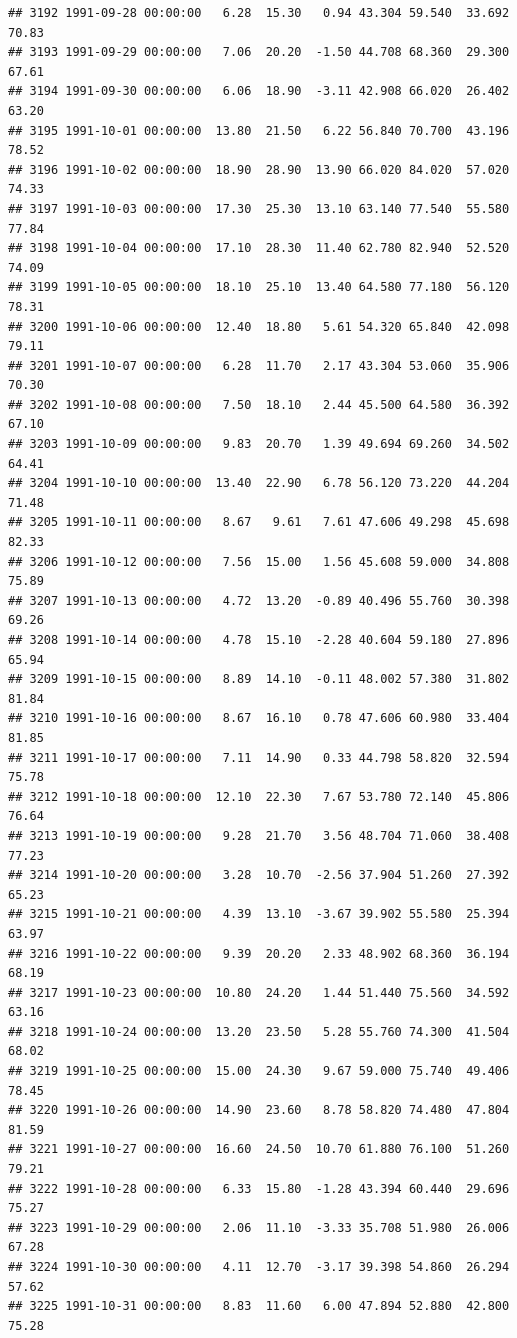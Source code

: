 \documentclass{article}\usepackage{graphicx, color}
\makeatletter
\newenvironment{kframe}{%
 \def\at@end@of@kframe{}%
 \ifinner\ifhmode%
  \def\at@end@of@kframe{\end{minipage}}%
  \begin{minipage}{\columnwidth}%
 \fi\fi%
 \def\FrameCommand##1{\hskip\@totalleftmargin \hskip-\fboxsep
 \colorbox{shadecolor}{##1}\hskip-\fboxsep
     \hskip-\linewidth \hskip-\@totalleftmargin \hskip\columnwidth}%
 \MakeFramed {\advance\hsize-\width
   \@totalleftmargin\z@ \linewidth\hsize
   \@setminipage}}%
 {\par\unskip\endMakeFramed%
 \at@end@of@kframe}
\newenvironment{knitrout}{}{} %
\makeatother
\begin{document}
\begin{knitrout}
\begin{kframe}
\begin{verbatim}
## 3192 1991-09-28 00:00:00   6.28  15.30   0.94 43.304 59.540  33.692  70.83
## 3193 1991-09-29 00:00:00   7.06  20.20  -1.50 44.708 68.360  29.300  67.61
## 3194 1991-09-30 00:00:00   6.06  18.90  -3.11 42.908 66.020  26.402  63.20
## 3195 1991-10-01 00:00:00  13.80  21.50   6.22 56.840 70.700  43.196  78.52
## 3196 1991-10-02 00:00:00  18.90  28.90  13.90 66.020 84.020  57.020  74.33
## 3197 1991-10-03 00:00:00  17.30  25.30  13.10 63.140 77.540  55.580  77.84
## 3198 1991-10-04 00:00:00  17.10  28.30  11.40 62.780 82.940  52.520  74.09
## 3199 1991-10-05 00:00:00  18.10  25.10  13.40 64.580 77.180  56.120  78.31
## 3200 1991-10-06 00:00:00  12.40  18.80   5.61 54.320 65.840  42.098  79.11
## 3201 1991-10-07 00:00:00   6.28  11.70   2.17 43.304 53.060  35.906  70.30
## 3202 1991-10-08 00:00:00   7.50  18.10   2.44 45.500 64.580  36.392  67.10
## 3203 1991-10-09 00:00:00   9.83  20.70   1.39 49.694 69.260  34.502  64.41
## 3204 1991-10-10 00:00:00  13.40  22.90   6.78 56.120 73.220  44.204  71.48
## 3205 1991-10-11 00:00:00   8.67   9.61   7.61 47.606 49.298  45.698  82.33
## 3206 1991-10-12 00:00:00   7.56  15.00   1.56 45.608 59.000  34.808  75.89
## 3207 1991-10-13 00:00:00   4.72  13.20  -0.89 40.496 55.760  30.398  69.26
## 3208 1991-10-14 00:00:00   4.78  15.10  -2.28 40.604 59.180  27.896  65.94
## 3209 1991-10-15 00:00:00   8.89  14.10  -0.11 48.002 57.380  31.802  81.84
## 3210 1991-10-16 00:00:00   8.67  16.10   0.78 47.606 60.980  33.404  81.85
## 3211 1991-10-17 00:00:00   7.11  14.90   0.33 44.798 58.820  32.594  75.78
## 3212 1991-10-18 00:00:00  12.10  22.30   7.67 53.780 72.140  45.806  76.64
## 3213 1991-10-19 00:00:00   9.28  21.70   3.56 48.704 71.060  38.408  77.23
## 3214 1991-10-20 00:00:00   3.28  10.70  -2.56 37.904 51.260  27.392  65.23
## 3215 1991-10-21 00:00:00   4.39  13.10  -3.67 39.902 55.580  25.394  63.97
## 3216 1991-10-22 00:00:00   9.39  20.20   2.33 48.902 68.360  36.194  68.19
## 3217 1991-10-23 00:00:00  10.80  24.20   1.44 51.440 75.560  34.592  63.16
## 3218 1991-10-24 00:00:00  13.20  23.50   5.28 55.760 74.300  41.504  68.02
## 3219 1991-10-25 00:00:00  15.00  24.30   9.67 59.000 75.740  49.406  78.45
## 3220 1991-10-26 00:00:00  14.90  23.60   8.78 58.820 74.480  47.804  81.59
## 3221 1991-10-27 00:00:00  16.60  24.50  10.70 61.880 76.100  51.260  79.21
## 3222 1991-10-28 00:00:00   6.33  15.80  -1.28 43.394 60.440  29.696  75.27
## 3223 1991-10-29 00:00:00   2.06  11.10  -3.33 35.708 51.980  26.006  67.28
## 3224 1991-10-30 00:00:00   4.11  12.70  -3.17 39.398 54.860  26.294  57.62
## 3225 1991-10-31 00:00:00   8.83  11.60   6.00 47.894 52.880  42.800  75.28

\end{verbatim}
\end{kframe}
\end{knitrout}
\end{document}

